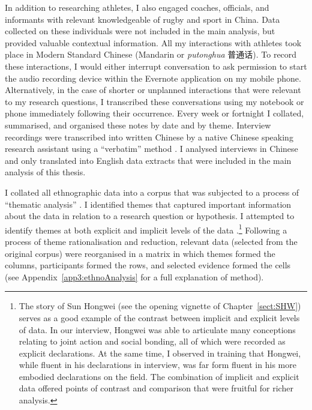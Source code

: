 \begin{CJK}{UTF8}{gbsn}
 In addition to researching athletes, I also engaged coaches, officials, and informants with relevant knowledgeable of rugby and sport in China. Data collected on these individuals were not included in the main analysis, but provided valuable contextual information.
 All my interactions with athletes took place in Modern Standard Chinese (Mandarin or \textit{putonghua} 普通话).  To record these interactions, I would either interrupt conversation to ask permission to start the audio recording device within the Evernote application on my mobile phone.  Alternatively, in the case of shorter or unplanned interactions that were relevant to my research questions,  I transcribed these conversations using my notebook or phone immediately following their occurrence.  Every week or fortnight I collated, summarised, and organised these notes by date and by theme.  Interview recordings were transcribed into written Chinese by a native Chinese speaking research assistant using a ``verbatim'' method \citep[i.e., including an account of all verbal and important nonverbal (coughs, pauses, etc.) utterances, see][269-70]{Poland2003}.  I analysed interviews in Chinese and only translated into English data extracts that were included in the main analysis of this thesis.

 I collated all ethnographic data into a corpus that was subjected to a process of ``thematic analysis'' \citep{Braun2006}. I identified themes that captured important information about the data in relation to a research question or hypothesis.
 I attempted to identify themes at both explicit and implicit levels of the data \citep{Boyatzis1998}.\footnote{The story of Sun Hongwei (see the opening vignette of Chapter~\ref{sect:SHW}) serves as a good example of the contrast between implicit and explicit levels of data.  In our interview, Hongwei was able to articulate many conceptions relating to joint action and social bonding, all of which were recorded as explicit declarations.  At the same time, I observed in training that Hongwei, while fluent in his declarations in interview, was far form fluent in his more embodied declarations on the field.  The combination of implicit and explicit data offered points of contrast and comparison that were fruitful for richer analysis.}  Following a process of theme rationalisation and reduction,
 relevant data (selected from the original corpus) were reorganised in a matrix in which themes formed the columns, participants formed the rows, and selected evidence formed the cells (see Appendix~\ref{app3:ethnoAnalysis} for a full explanation of method).



\end{CJK}
